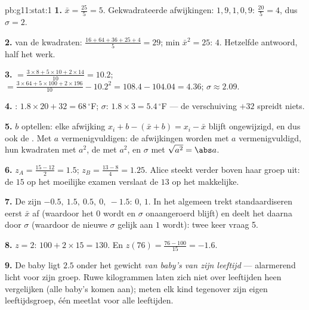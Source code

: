 \begin{solution}{pb:g11:stat:1}
\textbf{1.}  $\bar x = \frac{25}{5} = 5$. Gekwadrateerde
afwijkingen: $1, 9, 1, 0, 9$:  $\frac{20}{5} = 4$, dus $\sigma = 2$.

\textbf{2.}  van de kwadraten:
$\frac{16 + 64 + 36 + 25 + 4}{5} = 29$; min $\bar x^2 = 25$:  $4$.
Hetzelfde antwoord, half het werk.

\textbf{3.}  $= \frac{3 \times 8 + 5 \times 10 + 2 \times 14}{10}
= 10.2$;  $= \frac{3 \times 64 + 5 \times 100 + 2 \times 196}{10} -
10.2^2 = 108.4 - 104.04 = 4.36$; $\sigma \approx 2.09$.

\textbf{4.} : $1.8 \times 20 + 32 = 68\,^\circ$F; $\sigma$:
$1.8 \times 3 = 5.4\,^\circ$F --- de verschuiving $+32$ spreidt niets.

\textbf{5.} $b$ optellen: elke afwijking $x_i + b - (\bar x + b) =
x_i - \bar x$ blijft ongewijzigd, en dus ook de . Met $a$
vermenigvuldigen: de afwijkingen worden met $a$ vermenigvuldigd, hun
kwadraten met $a^2$, de  met $a^2$, en $\sigma$ met
$\sqrt{a^2} = \abs a$.

\textbf{6.} $z_A = \frac{15 - 12}{2} = 1.5$; $z_B = \frac{13 - 8}{4} =
1.25$. Alice steekt verder boven haar groep uit: de $15$ op het moeilijke
examen verslaat de $13$ op het makkelijke.

\textbf{7.} De  zijn $-0.5,\ 1.5,\ 0.5,\ 0,\ -1.5$:  $0$,
 $1$. In het algemeen trekt standaardiseren eerst $\bar x$
af (waardoor het  $0$ wordt en $\sigma$ onaangeroerd blijft) en
deelt het daarna door $\sigma$ (waardoor de nieuwe $\sigma$ gelijk aan $1$
wordt): twee keer vraag 5.

\textbf{8.} $z = 2$: $100 + 2 \times 15 = 130$. En
$z(76) = \frac{76 - 100}{15} = -1.6$.

\textbf{9.} De baby ligt $2.5$  onder het 
gewicht \emph{van baby's van zijn leeftijd} --- alarmerend licht voor zijn
groep. Ruwe kilogrammen laten zich niet over leeftijden heen vergelijken
(alle baby's komen aan);  meten elk kind tegenover zijn eigen
leeftijdsgroep, één meetlat voor alle leeftijden.


\end{solution}
